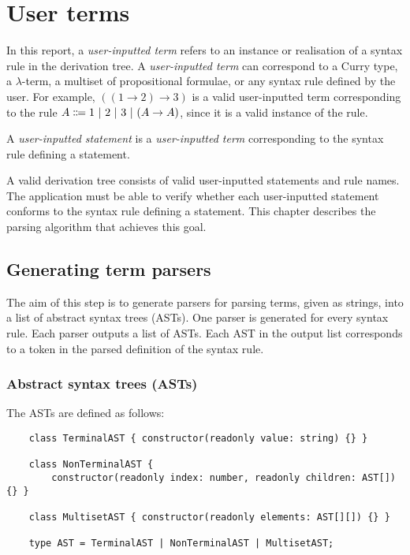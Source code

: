 \section{User terms}
\label{section:term}
In this report, a \textit{user-inputted term} refers to an instance or realisation of a syntax rule in the derivation tree. A \textit{user-inputted term} can correspond to a Curry type, a $\lambda$-term, a multiset of propositional formulae, or any syntax rule defined by the user. For example, $((1 \to 2) \to 3)$ is a valid user-inputted term corresponding to the rule $A \Coloneqq 1 \ |\  2 \ |\  3 \ |\  (A \to A)$, since it is a valid instance of the rule.

A \textit{user-inputted statement} is a \textit{user-inputted term} corresponding to the syntax rule defining a statement.

A valid derivation tree consists of valid user-inputted statements and rule names. The application must be able to verify whether each user-inputted statement conforms to the syntax rule defining a statement. This chapter describes the parsing algorithm that achieves this goal.

\subsection{Generating term parsers}
The aim of this step is to generate parsers for parsing terms, given as strings, into a list of abstract syntax trees (ASTs). One parser is generated for every syntax rule. Each parser outputs a list of ASTs. Each AST in the output list corresponds to a token in the parsed definition of the syntax rule.

\subsubsection{Abstract syntax trees (ASTs)}
The ASTs are defined as follows:
\begin{lstlisting}
    class TerminalAST { constructor(readonly value: string) {} }

    class NonTerminalAST {
        constructor(readonly index: number, readonly children: AST[]) {} }

    class MultisetAST { constructor(readonly elements: AST[][]) {} }

    type AST = TerminalAST | NonTerminalAST | MultisetAST;
\end{lstlisting}

